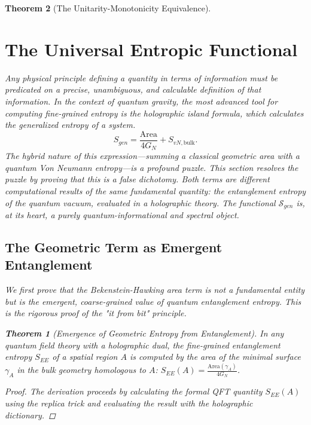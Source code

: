 \documentclass[11pt, letterpaper]{report}
\theoremstyle{plain} %
\newtheorem{theorem}{Theorem}[chapter]
\theoremstyle{definition} %
\theoremstyle{remark} %
\begin{document}
\begin{theorem}[The Unitarity-Monotonicity Equivalence]
\section{The Universal Entropic Functional}
\label{sec:universal_entropic_functional_revised}

Any physical principle defining a quantity in terms of information must be predicated on a precise, unambiguous, and calculable definition of that information. In the context of quantum gravity, the most advanced tool for computing fine-grained entropy is the holographic island formula, which calculates the generalized entropy of a system.
\begin{equation}
    S_{gen} = \frac{\text{Area}}{4G_N} + S_{vN, \text{bulk}}.
    \label{eq:generalized_entropy_form}
\end{equation}
The hybrid nature of this expression---summing a classical geometric area with a quantum Von Neumann entropy---is a profound puzzle. This section resolves the puzzle by proving that this is a false dichotomy. Both terms are different computational results of the same fundamental quantity: the entanglement entropy of the quantum vacuum, evaluated in a holographic theory. The functional $\mathcal{S}_{gen}$ is, at its heart, a purely quantum-informational and spectral object.

\subsection{The Geometric Term as Emergent Entanglement}
\label{sec:proof_geometric_from_entanglement_revised}

We first prove that the Bekenstein-Hawking area term is not a fundamental entity but is the emergent, coarse-grained value of quantum entanglement entropy. This is the rigorous proof of the "it from bit" principle.

\begin{theorem}[Emergence of Geometric Entropy from Entanglement]
\label{thm:geometric_from_entanglement_final}
In any quantum field theory with a holographic dual, the fine-grained entanglement entropy $S_{EE}$ of a spatial region $A$ is computed by the area of the minimal surface $\gamma_A$ in the bulk geometry homologous to $A$: $S_{EE}(A) = \frac{\text{Area}(\gamma_A)}{4G_N}$.
\end{theorem}
\begin{proof}
The derivation proceeds by calculating the formal QFT quantity $S_{EE}(A)$ using the replica trick and evaluating the result with the holographic dictionary.


\end{proof}
\end{theorem}
\end{document}
